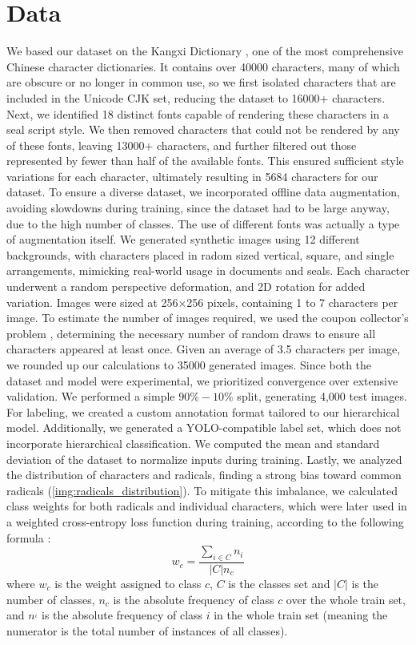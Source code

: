 \section{Data}
\label{sec:data}

We based our dataset on the Kangxi Dictionary \cite{WikipediaKangxi}, one of the most comprehensive Chinese character dictionaries. It contains over 40000 characters, many of which are obscure or no longer in common use, so we first isolated characters that are included in the Unicode CJK set, reducing the dataset to 16000+ characters.
Next, we identified 18 distinct fonts capable of rendering these characters in a seal script style. We then removed characters that could not be rendered by any of these fonts, leaving 13000+ characters, and further filtered out those represented by fewer than half of the available fonts. This ensured sufficient style variations for each character, ultimately resulting in 5684 characters for our dataset. To ensure a diverse dataset, we incorporated offline data augmentation, avoiding slowdowns during training, since the dataset had to be large anyway, due to the high number of classes. The use of different fonts was actually a type of augmentation itself. We generated synthetic images using 12 different backgrounds, with characters placed in radom sized vertical, square, and single arrangements, mimicking real-world usage in documents and seals. Each character underwent a random perspective deformation, and 2D rotation for added variation. Images were sized at 256×256 pixels, containing 1 to 7 characters per image.
To estimate the number of images required, we used the coupon collector’s problem \cite{CouponCollectorProblem}, determining the necessary number of random draws to ensure all characters appeared at least once.
Given an average of 3.5 characters per image, we rounded up our calculations to 35000 generated images. Since both the dataset and model were experimental, we prioritized convergence over extensive validation. We performed a simple $90\%-10\%$ split, generating 4,000 test images.
For labeling, we created a custom annotation format tailored to our hierarchical model. Additionally, we generated a YOLO-compatible label set, which does not incorporate hierarchical classification. We computed the mean and standard deviation of the dataset to normalize inputs during training. Lastly, we analyzed the distribution of characters and radicals, finding a strong bias toward common radicals (\ref{img:radicals_distribution}). To mitigate this imbalance, we calculated class weights for both radicals and individual characters, which were later used in a weighted cross-entropy loss function during training, according to the following formula \cite{WeightsFormulaArticle}:
\[
    w_c = \frac{\sum_{i \in C}{n_i}}{|C| n_c}
\]
where $w_c$ is the weight assigned to class $c$, $C$ is the classes set and $|C|$ is the number of classes, $n_c$ is the absolute frequency of class $c$ over the whole train set, and $n^_i$ is the absolute frequency of class $i$ in the whole train set (meaning the numerator is the total number of instances of all classes).

